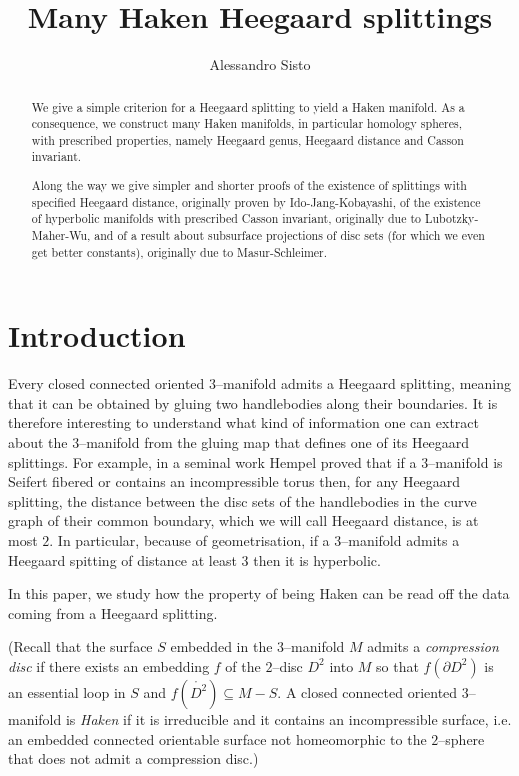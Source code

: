 \documentclass[11pt, oneside]{amsart}
\theoremstyle{definition}
\theoremstyle{definition}
\begin{document}
\title{Many Haken Heegaard splittings}
\author{Alessandro Sisto}


 \begin{abstract}
We give a simple criterion for a Heegaard splitting to yield a Haken manifold. As a consequence, we construct many Haken manifolds, in particular homology spheres, with prescribed properties, namely Heegaard genus, Heegaard distance and Casson invariant.

Along the way we give simpler and shorter proofs of the existence of splittings with specified Heegaard distance, originally proven by Ido-Jang-Kobayashi, of the existence of hyperbolic manifolds with prescribed Casson invariant, originally due to Lubotzky-Maher-Wu, and of a result about subsurface projections of disc sets (for which we even get better constants), originally due to Masur-Schleimer.
 \end{abstract}

\maketitle

\section{Introduction}
Every closed connected oriented $3$--manifold admits a Heegaard splitting, meaning that it can be obtained by gluing two handlebodies along their boundaries. It is therefore interesting to understand what kind of information one can extract about the $3$--manifold from the gluing map that defines one of its Heegaard splittings. For example, in a seminal work Hempel \cite{Hempel:Heegaard} proved that if a $3$--manifold is Seifert fibered or contains an incompressible torus then, for any Heegaard splitting, the distance between the disc sets of the handlebodies in the curve graph of their common boundary, which we will call Heegaard distance, is at most $2$. In particular, because of geometrisation, if a $3$--manifold admits a Heegaard spitting of distance at least $3$ then it is hyperbolic.

In this paper, we study how the property of being Haken can be read off the data coming from a Heegaard splitting.

 (Recall that the surface $S$ embedded in the $3$--manifold $M$ admits a \emph{compression disc} if there exists an embedding $f$ of the $2$--disc $D^2$ into $M$ so that $f(\partial D^2)$ is an essential loop in $S$ and $f(\mathring{D^2})\subseteq M-S$. A closed connected oriented $3$--manifold is \emph{Haken} if it is irreducible and it contains an incompressible surface, i.e. an embedded connected orientable surface not homeomorphic to the $2$--sphere that does not admit a compression disc.)
 
\end{document}
